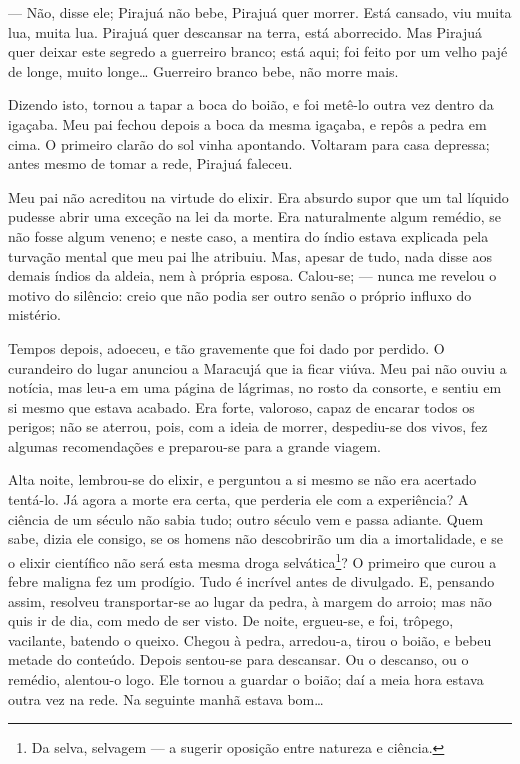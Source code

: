 --- Não, disse ele; Pirajuá não bebe, Pirajuá quer morrer. Está
cansado, viu muita lua, muita lua. Pirajuá quer descansar na terra, está
aborrecido. Mas Pirajuá quer deixar este segredo a guerreiro branco;
está aqui; foi feito por um velho pajé de longe, muito longe\ldots{}
Guerreiro branco bebe, não morre mais.

Dizendo isto, tornou a tapar a boca do boião, e foi metê-lo outra vez
dentro da igaçaba. Meu pai fechou depois a boca da mesma igaçaba, e
repôs a pedra em cima. O primeiro clarão do sol vinha apontando.
Voltaram para casa depressa; antes mesmo de tomar a rede, Pirajuá
faleceu.

Meu pai não acreditou na virtude do elixir. Era absurdo supor que um tal
líquido pudesse abrir uma exceção na lei da morte. Era naturalmente
algum remédio, se não fosse algum veneno; e neste caso, a mentira do
índio estava explicada pela turvação mental que meu pai lhe atribuiu.
Mas, apesar de tudo, nada disse aos demais índios da aldeia, nem à
própria esposa. Calou-se; --- nunca me revelou o motivo do silêncio:
creio que não podia ser outro senão o próprio influxo do mistério.

Tempos depois, adoeceu, e tão gravemente que foi dado por perdido. O
curandeiro do lugar anunciou a Maracujá que ia ficar viúva. Meu pai não
ouviu a notícia, mas leu-a em uma página de lágrimas, no rosto da
consorte, e sentiu em si mesmo que estava acabado. Era forte, valoroso,
capaz de encarar todos os perigos; não se aterrou, pois, com a ideia de
morrer, despediu-se dos vivos, fez algumas recomendações e preparou-se
para a grande viagem.

Alta noite, lembrou-se do elixir, e perguntou a si mesmo se não era
acertado tentá-lo. Já agora a morte era certa, que perderia ele com a
experiência? A ciência de um século não sabia tudo; outro século vem e
passa adiante. Quem sabe, dizia ele consigo, se os homens não
descobrirão um dia a imortalidade, e se o elixir científico não será
esta mesma droga selvática\footnote{Da selva, selvagem --- a sugerir
  oposição entre natureza e ciência.}? O primeiro que curou a febre
maligna fez um prodígio. Tudo é incrível antes de divulgado. E, pensando
assim, resolveu transportar-se ao lugar da pedra, à margem do arroio;
mas não quis ir de dia, com medo de ser visto. De noite, ergueu-se, e
foi, trôpego, vacilante, batendo o queixo. Chegou à pedra, arredou-a,
tirou o boião, e bebeu metade do conteúdo. Depois sentou-se para
descansar. Ou o descanso, ou o remédio, alentou-o logo. Ele tornou a
guardar o boião; daí a meia hora estava outra vez na rede. Na seguinte
manhã estava bom\ldots{}

